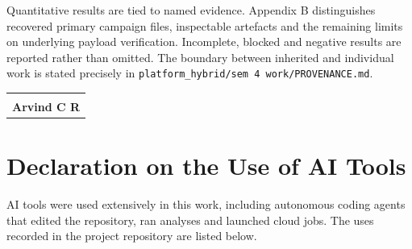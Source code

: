 \documentclass[12pt,a4paper]{report}
\begin{document}
Quantitative results are tied to named evidence. Appendix B distinguishes
recovered primary campaign files, inspectable artefacts and the remaining
limits on underlying payload verification. Incomplete, blocked and negative
results are reported rather than omitted. The boundary between inherited and
individual work is stated precisely in \texttt{platform\_hybrid/sem 4
work/PROVENANCE.md}.

\vspace{0.3in}
\noindent\begin{tabular}{@{}p{2.6in}@{}}

\dotfill \\
\textbf{Arvind C R} \\

\end{tabular}

\chapter*{Declaration on the Use of AI Tools}
\thispagestyle{plain}

AI tools were used extensively in this work, including autonomous coding
agents that edited the repository, ran analyses and launched cloud jobs. The
uses recorded in the project repository are listed below.
\end{document}
